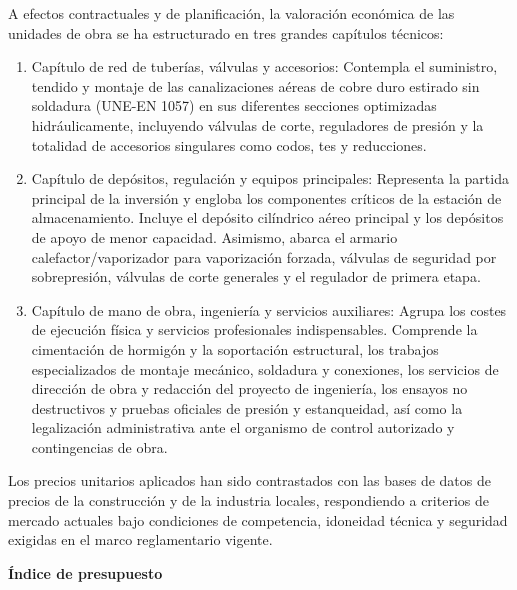 \documentclass[12pt]{article}
\begin{document}
        A efectos contractuales y de planificación, la valoración económica de las unidades de obra se ha estructurado en tres grandes capítulos técnicos:
        
        \begin{enumerate}
            \item Capítulo de red de tuberías, válvulas y accesorios: 
            Contempla el suministro, tendido y montaje de las canalizaciones aéreas de cobre duro estirado sin soldadura (UNE-EN 1057) en sus diferentes secciones optimizadas hidráulicamente, incluyendo válvulas de corte, reguladores de presión y la totalidad de accesorios singulares como codos, tes y reducciones.
            
            \item Capítulo de depósitos, regulación y equipos principales: 
            Representa la partida principal de la inversión y engloba los componentes críticos de la estación de almacenamiento. Incluye el depósito cilíndrico aéreo principal y los depósitos de apoyo de menor capacidad. Asimismo, abarca el armario calefactor/vaporizador para vaporización forzada, válvulas de seguridad por sobrepresión, válvulas de corte generales y el regulador de primera etapa.
            
            \item Capítulo de mano de obra, ingeniería y servicios auxiliares: 
            Agrupa los costes de ejecución física y servicios profesionales indispensables. Comprende la cimentación de hormigón y la soportación estructural, los trabajos especializados de montaje mecánico, soldadura y conexiones, los servicios de dirección de obra y redacción del proyecto de ingeniería, los ensayos no destructivos y pruebas oficiales de presión y estanqueidad, así como la legalización administrativa ante el organismo de control autorizado y contingencias de obra.
        \end{enumerate}

        Los precios unitarios aplicados han sido contrastados con las bases de datos de precios de la construcción y de la industria locales, respondiendo a criterios de mercado actuales bajo condiciones de competencia, idoneidad técnica y seguridad exigidas en el marco reglamentario vigente.

        \clearpage

        \clearpage
        \thispagestyle{empty}
        \vspace*{\fill}
        \begin{center}
            {\fontsize{14pt}{14pt}\selectfont\bfseries Índice de presupuesto}
        \end{center}
        \vspace*{\fill}
        \clearpage
\end{document}

